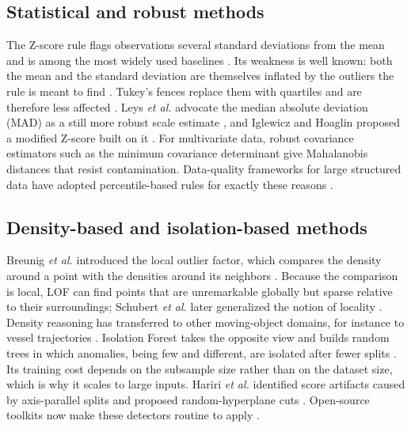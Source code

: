 \documentclass{ieeeaccess}
\begin{document}
\subsection{Statistical and robust methods}
The Z-score rule flags observations several standard deviations from the mean and is among the most widely used baselines \cite{agarwal2021}. Its weakness is well known: both the mean and the standard deviation are themselves inflated by the outliers the rule is meant to find \cite{leys2013,rousseeuw2011}. Tukey's fences replace them with quartiles and are therefore less affected \cite{tukey1977}. Leys \emph{et al.} advocate the median absolute deviation (MAD) as a still more robust scale estimate \cite{leys2013}, and Iglewicz and Hoaglin proposed a modified Z-score built on it \cite{iglewicz1993}. For multivariate data, robust covariance estimators such as the minimum covariance determinant \cite{rousseeuw1999} give Mahalanobis distances that resist contamination. Data-quality frameworks for large structured data have adopted percentile-based rules for exactly these reasons \cite{widad2023}.

\subsection{Density-based and isolation-based methods}
Breunig \emph{et al.} introduced the local outlier factor, which compares the density around a point with the densities around its neighbors \cite{breunig2000}. Because the comparison is local, LOF can find points that are unremarkable globally but sparse relative to their surroundings; Schubert \emph{et al.} later generalized the notion of locality \cite{schubert2014}. Density reasoning has transferred to other moving-object domains, for instance to vessel trajectories \cite{zhang2023ships}. Isolation Forest takes the opposite view and builds random trees in which anomalies, being few and different, are isolated after fewer splits \cite{liu2008}. Its training cost depends on the subsample size rather than on the dataset size, which is why it scales to large inputs. Hariri \emph{et al.} identified score artifacts caused by axis-parallel splits and proposed random-hyperplane cuts \cite{hariri2021}. Open-source toolkits now make these detectors routine to apply \cite{pedregosa2011,zhao2019pyod}.
\end{document}
